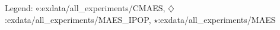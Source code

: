 Legend: {\color{CornflowerBlue}$\circ$}:exdata/all\_experiments/CMAES, {\color{Orange}$\diamondsuit$}:exdata/all\_experiments/MAES\_IPOP, {\color{Green}$\star$}:exdata/all\_experiments/MAES